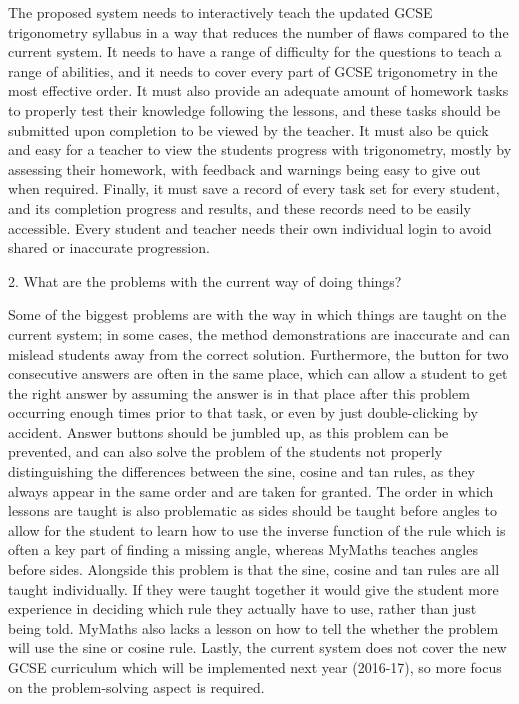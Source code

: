 The proposed system needs to interactively teach the updated GCSE trigonometry syllabus in a way that reduces the number of flaws compared to the current system. It needs to have a range of difficulty for the questions to teach a range of abilities, and it needs to cover every part of GCSE trigonometry in the most effective order. It must also provide an adequate amount of homework tasks to properly test their knowledge following the lessons, and these tasks should be submitted upon completion to be viewed by the teacher. It must also be quick and easy for a teacher to view the students progress with trigonometry, mostly by assessing their homework, with feedback and warnings being easy to give out when required. Finally, it must save a record of every task set for every student, and its completion progress and results, and these records need to be easily accessible. Every student and teacher needs their own individual login to avoid shared or inaccurate progression.

2. What are the problems with the current way of doing things?

Some of the biggest problems are with the way in which things are taught on the current system; in some cases, the method demonstrations are inaccurate and can mislead students away from the correct solution. Furthermore, the button for two consecutive answers are often in the same place, which can allow a student to get the right answer by assuming the answer is in that place after this problem occurring enough times prior to that task, or even by just double-clicking by accident. Answer buttons should be jumbled up, as this problem can be prevented, and can also solve the problem of the students not properly distinguishing the differences between the sine, cosine and tan rules, as they always appear in the same order and are taken for granted. The order in which lessons are taught is also problematic as sides should be taught before angles to allow for the student to learn how to use the inverse function of the rule which is often a key part of finding a missing angle, whereas MyMaths teaches angles before sides. Alongside this problem is that the sine, cosine and tan rules are all taught individually. If they were taught together it would give the student more experience in deciding which rule they actually have to use, rather than just being told. MyMaths also lacks a lesson on how to tell the whether the problem will use the sine or cosine rule. Lastly, the current system does not cover the new GCSE curriculum which will be implemented next year (2016-17), so more focus on the problem-solving aspect is required.

